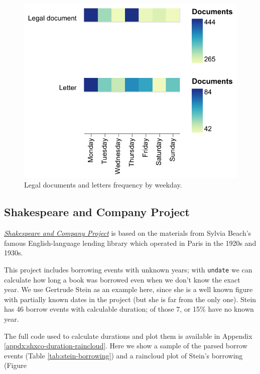 \documentclass{anthology-ch}         %
\begin{document}
\begin{figure}[h]
  \centering
  \includegraphics[width=0.4\linewidth]{assets/pgp_letters_legaldocs_weekday.pdf}
  \caption{Legal documents and letters frequency by weekday. }
  \label{fig:pgp-weekday-frequency}
\end{figure}


\subsection{Shakespeare and Company
Project}\label{shakespeare-and-company-project}

\href{https://shakespeareandco.princeton.edu/}{\textit{Shakespeare and Company
Project}} is based on the materials from Sylvia Beach's famous
English-language lending library which operated in Paris in the 1920s
and 1930s.

This project includes borrowing events with unknown years; with
\texttt{undate} we can calculate how long a book was borrowed even when
we don't know the exact year. We use Gertrude Stein as an example here, since she is a well known figure with partially known dates in the project (but she is far from the only one).
Stein has 46 borrow events with calculable duration; of those 7, or 15\% have no
known year.

The full code used to calculate durations and plot them is available in Appendix \ref{appdx:shxco-duration-raincloud}.  Here we show a sample of the parsed borrow events (Table \ref{tab:stein-borrowing}) and a raincloud plot of Stein's borrowing (Figure 
\end{document}
